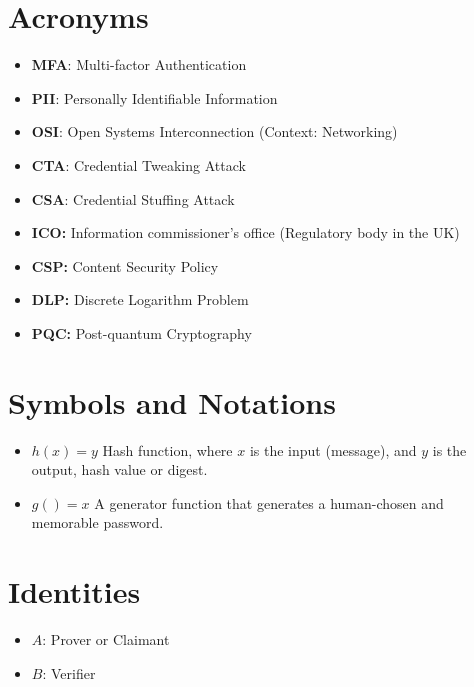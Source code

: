 \section{Acronyms}

\begin{itemize}
    \item \textbf{MFA}: Multi-factor Authentication
    \item \textbf{PII}: Personally Identifiable Information
    \item \textbf{OSI}: Open Systems Interconnection (Context: Networking)
    \item \textbf{CTA}: Credential Tweaking Attack
    \item \textbf{CSA}: Credential Stuffing Attack
    \item \textbf{ICO:} Information commissioner's office (Regulatory body in the UK)
    \item \textbf{CSP:} Content Security Policy
    \item \textbf{DLP:} Discrete Logarithm Problem
    \item \textbf{PQC:} Post-quantum Cryptography
\end{itemize}

\section{Symbols and Notations}

\begin{itemize}
    \item $h(x) = y$ Hash function, where $x$ is the input (message), and $y$ is the output, hash value or digest.
    \item $g() = x$ A generator function that generates a human-chosen and memorable password. 
\end{itemize}

\section{Identities}
\begin{itemize}
    \item $A$: Prover or Claimant
    \item $B$: Verifier
\end{itemize}